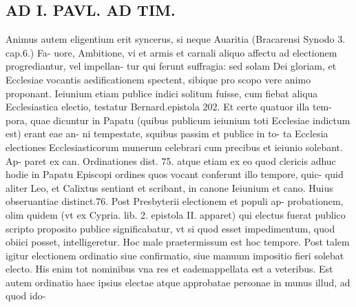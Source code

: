 \documentclass{article}
\begin{document}
\begin{pages}
\section*{AD I. PAVL. AD TIM. }
\marginpar{[ p.338 ]}\pstart Animus autem eligentium erit syncerus, si neque Auaritia (Bracarensi Synodo 3. cap.6.) Fa- uore, Ambitione, vi et armis et carnali aliquo affectu ad electionem progrediantur, vel impellan- tur qui ferunt suffragia: sed solam Dei gloriam, et Ecclesiae vocantis aedificationem spectent, sibique pro scopo vere animo proponant. Ieiunium etiam publice indici solitum fuisse, cum fiebat aliqua Ecclesiastica electio, testatur Bernard.epistola 202. Et certe quatuor illa tem- pora, quae dicuntur in Papatu (quibus publicum ieiunium toti Ecclesiae indictum est) erant eae an- ni tempestate, squibus passim et publice in to- ta Ecclesia electiones Ecclesiasticorum munerum celebrari cum precibus et ieiunio solebant. Ap- paret ex can. Ordinationes dist. 75. atque etiam ex eo quod clericis adhuc hodie in Papatu Episcopi ordines quos vocant conferunt illo tempore, quic- quid aliter Leo, et Calixtus sentiant et scribant, in canone Ieiunium et cano. Huius obseruantiae distinct.76. Post Presbyterii electionem et populi ap- probationem, olim quidem (vt ex Cypria. lib. 2. epistola II. apparet) qui electus fuerat publico scripto proposito publice significabatur, vt si quod esset impedimentum, quod obiici posset, intelligeretur. Hoc male praetermissum est hoc tempore. Post talem igitur electionem ordinatio siue confirmatio, siue manuum impositio fieri solebat electo. His enim tot nominibus vna res et eademappellata est a veteribus. Est autem ordinatio haec ipsius electae atque approbatae personae in munus illud, ad quod ido-  \pend

\end{pages}
\end{document}

